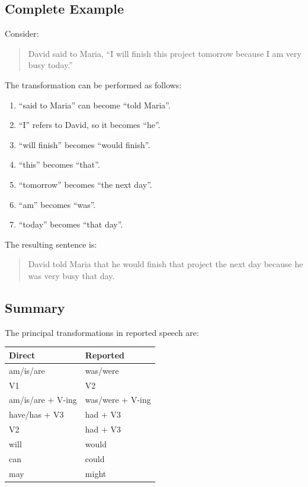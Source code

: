 \subsection{Complete Example}

Consider:

\begin{quotation}
David said to Maria, ``I will finish this project tomorrow because I am very
busy today.''
\end{quotation}

The transformation can be performed as follows:

\begin{enumerate}
    \item ``said to Maria'' can become ``told Maria''.
    \item ``I'' refers to David, so it becomes ``he''.
    \item ``will finish'' becomes ``would finish''.
    \item ``this'' becomes ``that''.
    \item ``tomorrow'' becomes ``the next day''.
    \item ``am'' becomes ``was''.
    \item ``today'' becomes ``that day''.
\end{enumerate}

The resulting sentence is:

\begin{quotation}
David told Maria that he would finish that project the next day because he
was very busy that day.
\end{quotation}


\subsection{Summary}

The principal transformations in reported speech are:

\begin{center}
\begin{tabular}{ll}
\textbf{Direct} & \textbf{Reported} \\ \hline
am/is/are & was/were \\
V1 & V2 \\
am/is/are + V-ing & was/were + V-ing \\
have/has + V3 & had + V3 \\
V2 & had + V3 \\
will & would \\
can & could \\
may & might
\end{tabular}
\end{center}

